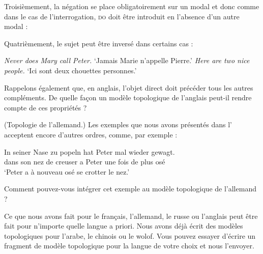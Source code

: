 {    \begin{exe}
    \begin{xlista}
    \end{xlista}
    \end{exe}
    Troisièmement, la négation se place obligatoirement sur un modal et donc comme dans le cas de l’interrogation, \textsc{do} doit être introduit en l’absence d’un autre modal :
    
    \begin{exe}
    \begin{xlista}
    \end{xlista}
    \end{exe}
    Quatrièmement, le sujet peut être inversé dans certains cas :
    
    \begin{exe}
    \begin{xlista}
    \ex  \textit{Never does Mary call Peter.}   ‘Jamais Marie n’appelle Pierre.’
    \ex  \textit{Here are two nice people.}     ‘Ici sont deux chouettes personnes.’
    \end{xlista}
    \end{exe}
    Rappelons également que, en anglais, l’objet direct doit précéder tous les autres compléments. De quelle façon un modèle topologique de l’anglais peut-il rendre compte de ces propriétés ?

     (Topologie de l’allemand.) Les exemples que nous avons présentés dans l’ acceptent encore d’autres ordres, comme, par exemple :

    \begin{exe}
    \sn
    \gll In seiner Nase zu popeln hat Peter {mal wieder} gewagt.\\
         dans son nez  de creuser  a   Peter   {une fois de plus}   osé\\
    \glt   ‘Peter a à nouveau osé se crotter le nez.’
    \end{exe}
  Comment pouvez-vous intégrer cet exemple au modèle topologique de l’allemand ?

     Ce que nous avons fait pour le français, l’allemand, le russe ou l’anglais peut être fait pour n’importe quelle langue a priori. Nous avons déjà écrit des modèles topologiques pour l’arabe, le chinois ou le wolof. Vous pouvez essayer d’écrire un fragment de modèle topologique pour la langue de votre choix et nous l’envoyer.
}
